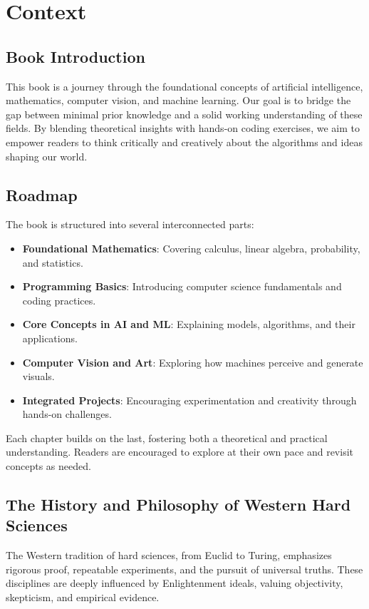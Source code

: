 \chapter{Context}

\section{Book Introduction}
This book is a journey through the foundational concepts of artificial intelligence, mathematics, computer vision, and machine learning. Our goal is to bridge the gap between minimal prior knowledge and a solid working understanding of these fields. By blending theoretical insights with hands-on coding exercises, we aim to empower readers to think critically and creatively about the algorithms and ideas shaping our world.

\section{Roadmap}
The book is structured into several interconnected parts:
\begin{itemize}
    \item \textbf{Foundational Mathematics}: Covering calculus, linear algebra, probability, and statistics.
    \item \textbf{Programming Basics}: Introducing computer science fundamentals and coding practices.
    \item \textbf{Core Concepts in AI and ML}: Explaining models, algorithms, and their applications.
    \item \textbf{Computer Vision and Art}: Exploring how machines perceive and generate visuals.
    \item \textbf{Integrated Projects}: Encouraging experimentation and creativity through hands-on challenges.
\end{itemize}
Each chapter builds on the last, fostering both a theoretical and practical understanding. Readers are encouraged to explore at their own pace and revisit concepts as needed.

\section{The History and Philosophy of Western Hard Sciences}
The Western tradition of hard sciences, from Euclid to Turing, emphasizes rigorous proof, repeatable experiments, and the pursuit of universal truths. These disciplines are deeply influenced by Enlightenment ideals, valuing objectivity, skepticism, and empirical evidence.

